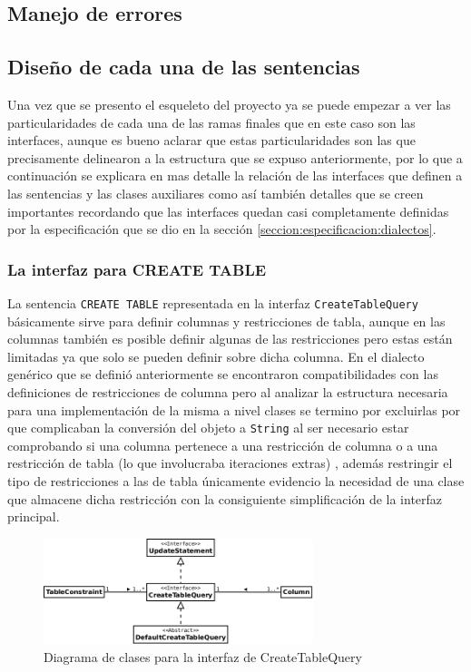 \subsection{Manejo de errores}

\subsection{Diseño de cada una de las sentencias}
Una vez que se presento el esqueleto del proyecto ya se puede empezar a ver las particularidades de cada una de las ramas finales que en este caso son las interfaces, aunque es bueno aclarar que estas particularidades son las que precisamente delinearon a la estructura que se expuso anteriormente, por lo que a continuación se explicara en mas detalle la relación de las interfaces que definen a las sentencias y las clases auxiliares como así también detalles que se creen importantes recordando que las interfaces quedan casi completamente definidas por la especificación que se dio en la sección \ref{seccion:especificacion:dialectos}.

\subsubsection{La interfaz para CREATE TABLE}
La sentencia \verb=CREATE TABLE= representada en la interfaz \verb=CreateTableQuery= básicamente sirve para definir columnas y restricciones de tabla, aunque en las columnas también es posible definir algunas de las restricciones pero estas están limitadas ya que solo se pueden definir sobre dicha columna. En el dialecto genérico que se definió anteriormente se encontraron compatibilidades con las definiciones de restricciones de columna pero al analizar la estructura necesaria para una implementación de la misma a nivel clases se termino por excluirlas por que complicaban la conversión del objeto a \verb=String= al ser necesario estar comprobando si una columna pertenece a una restricción de columna o a una restricción de tabla (lo que involucraba iteraciones extras) , además restringir el tipo de restricciones a las de tabla únicamente evidencio la  necesidad de una clase que almacene dicha restricción con la consiguiente simplificación de la interfaz principal.


\begin{figure}
  \centering
    \includegraphics[width=0.7\textwidth]{figuras/jdbgm-dc-createtable.png}
  \caption{Diagrama de clases para la interfaz de CreateTableQuery}
  \label{fig:dc-createtable}
\end{figure}


